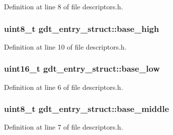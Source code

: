 Definition at line 8 of file descriptors.\+h.

\subsubsection[{\texorpdfstring{base\+\_\+high}{base_high}}]{\setlength{\rightskip}{0pt plus 5cm}uint8\+\_\+t gdt\+\_\+entry\+\_\+struct\+::base\+\_\+high}\hypertarget{structgdt__entry__struct_aa08eedea9c0f707b9fa052b7567879c7}{}\label{structgdt__entry__struct_aa08eedea9c0f707b9fa052b7567879c7}


Definition at line 10 of file descriptors.\+h.

\subsubsection[{\texorpdfstring{base\+\_\+low}{base_low}}]{\setlength{\rightskip}{0pt plus 5cm}uint16\+\_\+t gdt\+\_\+entry\+\_\+struct\+::base\+\_\+low}\hypertarget{structgdt__entry__struct_adba88eafea5f07167d181e4090cbcf49}{}\label{structgdt__entry__struct_adba88eafea5f07167d181e4090cbcf49}


Definition at line 6 of file descriptors.\+h.

\subsubsection[{\texorpdfstring{base\+\_\+middle}{base_middle}}]{\setlength{\rightskip}{0pt plus 5cm}uint8\+\_\+t gdt\+\_\+entry\+\_\+struct\+::base\+\_\+middle}\hypertarget{structgdt__entry__struct_a986d46963d3ccdbec85b3749c1e09abf}{}\label{structgdt__entry__struct_a986d46963d3ccdbec85b3749c1e09abf}


Definition at line 7 of file descriptors.\+h.

